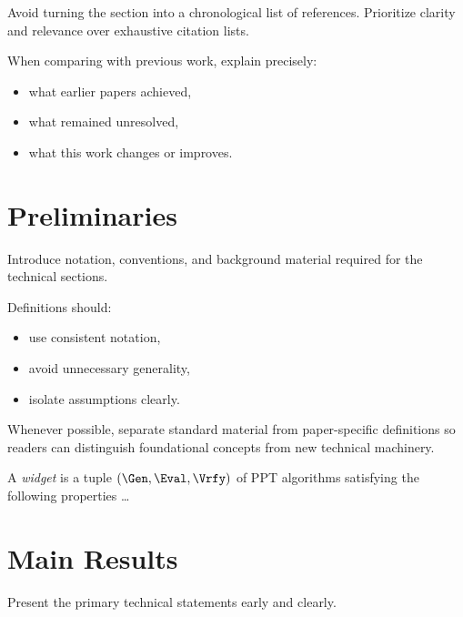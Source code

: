 \documentclass[
    letterpaper,
    runningheads,
    USenglish
  ]{llncs}
\begin{document}
Avoid turning the section into a chronological list of references. Prioritize
clarity and relevance over exhaustive citation lists.

When comparing with previous work, explain precisely:
\begin{itemize}
	\item what earlier papers achieved,
	\item what remained unresolved,
	\item what this work changes or improves.
\end{itemize}


\section{Preliminaries}
\label{sec:prelim}

Introduce notation, conventions, and background material required for
the technical sections.

Definitions should:
\begin{itemize}
	\item use consistent notation,
	\item avoid unnecessary generality,
	\item isolate assumptions clearly.
\end{itemize}

Whenever possible, separate standard material from paper-specific
definitions so readers can distinguish foundational concepts from new
technical machinery.

\begin{definition}
	\label{def:example}
	A \emph{widget} is a tuple $(\Gen,\Eval,\Vrfy)$ of PPT algorithms
	satisfying the following properties \ldots
\end{definition}


\section{Main Results}
\label{sec:main}

Present the primary technical statements early and clearly.
\end{document}

